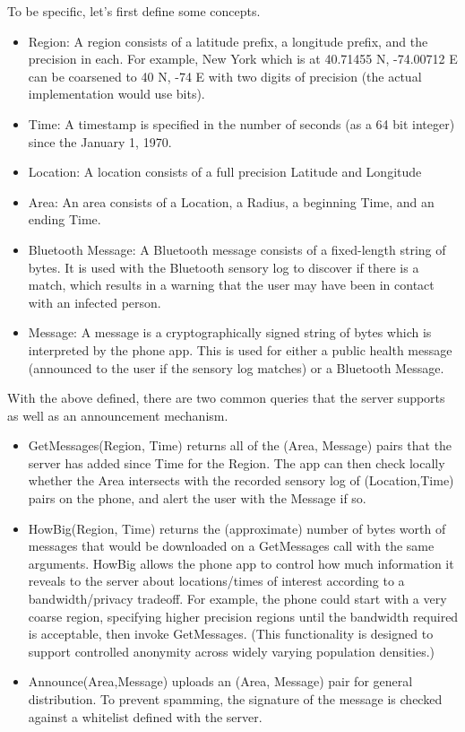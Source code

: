 \documentclass{article}
\begin{document}
To be specific, let's first define some concepts.
\begin{itemize}
    \item Region: A region consists of a latitude prefix, a longitude prefix, and the precision in each.  For example, New York which is at 40.71455 N, -74.00712 E can be coarsened to 40 N, -74 E with two digits of precision (the actual implementation would use bits).
    \item Time: A timestamp is specified in the number of seconds (as a 64 bit integer) since the January 1, 1970. 
    \item Location: A location consists of a full precision Latitude and Longitude
    \item Area: An area consists of a Location, a Radius, a beginning Time, and an ending Time.
    \item Bluetooth Message: A Bluetooth message consists of a fixed-length string of bytes.  It is used with the Bluetooth sensory log to discover if there is a match, which results in a warning that the user may have been in contact with an infected person.  
    \item Message: A message is a cryptographically signed string of bytes which is interpreted by the phone app. This is used for either a public health message (announced to the user if the sensory log matches) or a Bluetooth Message. 
\end{itemize}

With the above defined, there are two common queries that the server supports as well as an announcement mechanism.
\begin{itemize}
    \item GetMessages(Region, Time) returns all of the (Area, Message) pairs that the server has added since Time for the Region. The app can then check locally whether the Area intersects with the recorded sensory log of (Location,Time) pairs on the phone, and alert the user with the Message if so.   
    \item HowBig(Region, Time) returns the (approximate) number of bytes worth of messages that would be downloaded on a GetMessages call with the same arguments.  HowBig allows the phone app to control how much information it reveals to the server about locations/times of interest according to a bandwidth/privacy tradeoff.  For example, the phone could start with a very coarse region, specifying higher precision regions until the bandwidth required is acceptable, then invoke GetMessages.  (This functionality is designed to support controlled anonymity across widely varying population densities.)
    \item Announce(Area,Message) uploads an (Area, Message) pair for general distribution.  To prevent spamming, the signature of the message is checked against a whitelist defined with the server. 
\end{itemize}
\end{document}
